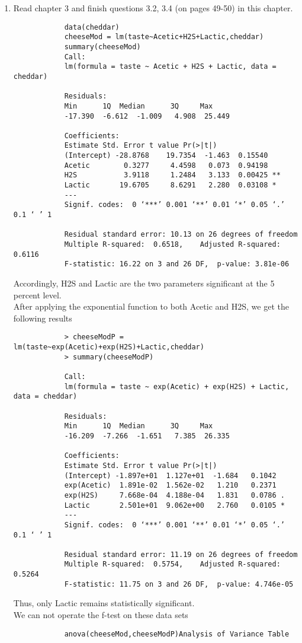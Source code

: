 \documentclass[12pt]{article}
\begin{document}
	\begin{enumerate}
		\item Read chapter 3 and finish questions 3.2, 3.4  (on pages 49-50) in this chapter.
		\begin{verbatim}
			data(cheddar)
			cheeseMod = lm(taste~Acetic+H2S+Lactic,cheddar)
			summary(cheeseMod)
			Call:
			lm(formula = taste ~ Acetic + H2S + Lactic, data = cheddar)
			
			Residuals:
			Min      1Q  Median      3Q     Max 
			-17.390  -6.612  -1.009   4.908  25.449 
			
			Coefficients:
			Estimate Std. Error t value Pr(>|t|)   
			(Intercept) -28.8768    19.7354  -1.463  0.15540   
			Acetic        0.3277     4.4598   0.073  0.94198   
			H2S           3.9118     1.2484   3.133  0.00425 **
			Lactic       19.6705     8.6291   2.280  0.03108 * 
			---
			Signif. codes:  0 ‘***’ 0.001 ‘**’ 0.01 ‘*’ 0.05 ‘.’ 0.1 ‘ ’ 1
			
			Residual standard error: 10.13 on 26 degrees of freedom
			Multiple R-squared:  0.6518,	Adjusted R-squared:  0.6116 
			F-statistic: 16.22 on 3 and 26 DF,  p-value: 3.81e-06
		\end{verbatim}
		Accordingly, H2S and Lactic are the two parameters significant at the 5 percent level.\\
		After applying the exponential function to both Acetic and H2S, we get the following results 
		\begin{verbatim}
			> cheeseModP = lm(taste~exp(Acetic)+exp(H2S)+Lactic,cheddar)
			> summary(cheeseModP)
			
			Call:
			lm(formula = taste ~ exp(Acetic) + exp(H2S) + Lactic, data = cheddar)
			
			Residuals:
			Min      1Q  Median      3Q     Max 
			-16.209  -7.266  -1.651   7.385  26.335 
			
			Coefficients:
			Estimate Std. Error t value Pr(>|t|)  
			(Intercept) -1.897e+01  1.127e+01  -1.684   0.1042  
			exp(Acetic)  1.891e-02  1.562e-02   1.210   0.2371  
			exp(H2S)     7.668e-04  4.188e-04   1.831   0.0786 .
			Lactic       2.501e+01  9.062e+00   2.760   0.0105 *
			---
			Signif. codes:  0 ‘***’ 0.001 ‘**’ 0.01 ‘*’ 0.05 ‘.’ 0.1 ‘ ’ 1
			
			Residual standard error: 11.19 on 26 degrees of freedom
			Multiple R-squared:  0.5754,	Adjusted R-squared:  0.5264 
			F-statistic: 11.75 on 3 and 26 DF,  p-value: 4.746e-05
		\end{verbatim}
		Thus, only Lactic remains statistically significant.\\
		We can not operate the f-test on these data sets 
		\begin{verbatim}
			anova(cheeseMod,cheeseModP)Analysis of Variance Table
			

\end{verbatim}
\end{enumerate}
\end{document}
